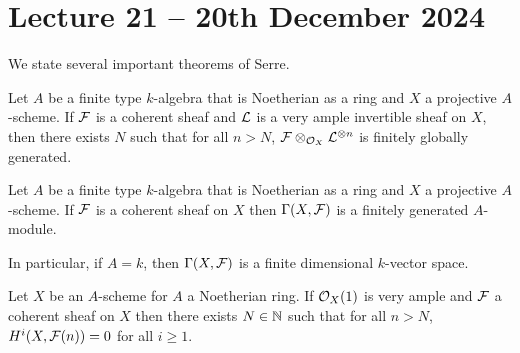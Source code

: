 \section{Lecture 21 -- 20th December 2024}\label{sec: lecture 21}
We state several important theorems of Serre. 
\begin{theorem}\label{def: Serre global generation}
    Let $A$ be a finite type $k$-algebra that is Noetherian as a ring and $X$ a projective $A$-scheme. If $\mathcal{F}$ is a coherent sheaf and $\mathcal{L}$ is a very ample invertible sheaf on $X$, then there exists $N$ such that for all $n>N$, $\mathcal{F}\otimes_{\mathcal{O}_{X}}\mathcal{L}^{\otimes n}$ is finitely globally generated. 
\end{theorem}
\begin{theorem}\label{thm: Serre cohomology}
    Let $A$ be a finite type $k$-algebra that is Noetherian as a ring and $X$ a projective $A$-scheme. If $\mathcal{F}$ is a coherent sheaf on $X$ then $\Gamma(X,\mathcal{F})$ is a finitely generated $A$-module. 
\end{theorem}
In particular, if $A=k$, then $\Gamma(X,\mathcal{F})$ is a finite dimensional $k$-vector space. 
\begin{theorem}\label{thm: Serre-Grothendieck vanishing}
    Let $X$ be an $A$-scheme for $A$ a Noetherian ring. If $\mathcal{O}_{X}(1)$ is very ample and $\mathcal{F}$ a coherent sheaf on $X$ then there exists $N\in\mathbb{N}$ such that for all $n>N$, $H^{i}(X,\mathcal{F}(n))=0$ for all $i\geq 1$. 
\end{theorem}
